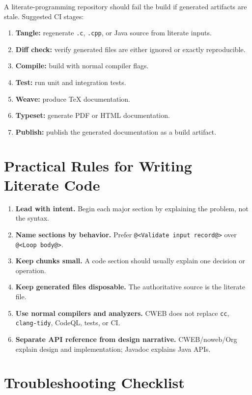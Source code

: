 \documentclass[11pt]{article}
\begin{document}
A literate-programming repository should fail the build if generated artifacts are stale. Suggested CI stages:

\begin{enumerate}
  \item \textbf{Tangle:} regenerate \texttt{.c}, \texttt{.cpp}, or Java source from literate inputs.
  \item \textbf{Diff check:} verify generated files are either ignored or exactly reproducible.
  \item \textbf{Compile:} build with normal compiler flags.
  \item \textbf{Test:} run unit and integration tests.
  \item \textbf{Weave:} produce TeX documentation.
  \item \textbf{Typeset:} generate PDF or HTML documentation.
  \item \textbf{Publish:} publish the generated documentation as a build artifact.
\end{enumerate}

\section{Practical Rules for Writing Literate Code}

\begin{enumerate}
  \item \textbf{Lead with intent.} Begin each major section by explaining the problem, not the syntax.
  \item \textbf{Name sections by behavior.} Prefer \texttt{@<Validate input record@>} over \texttt{@<Loop body@>}.
  \item \textbf{Keep chunks small.} A code section should usually explain one decision or operation.
  \item \textbf{Keep generated files disposable.} The authoritative source is the literate file.
  \item \textbf{Use normal compilers and analyzers.} CWEB does not replace \texttt{cc}, \texttt{clang-tidy}, CodeQL, tests, or CI.
  \item \textbf{Separate API reference from design narrative.} CWEB/noweb/Org explain design and implementation; Javadoc explains Java APIs.
\end{enumerate}

\section{Troubleshooting Checklist}
\end{document}
